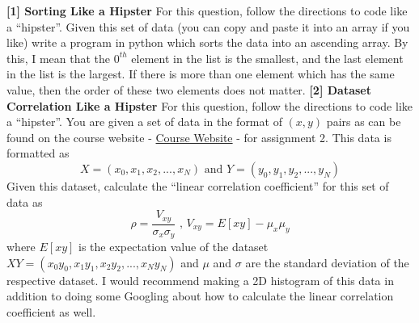 \documentclass[12pt]{article}
\begin{document}
\newline
\newline
\textbf{[1] Sorting Like a Hipster}
\newline
For this question, follow the directions to code like a ``hipster''.  
\newline
\newline
Given this set of data (you can copy and paste it into an array if you like)
\newline
\newline
[71, 51, 32, 62, 84, 109, 43, 92, 72, 41, 102, 80, 72, 69, 46, 94, 52, 95, 90, 72, 63, 70, 34, 80, 78, 34, 31, 37, 26, 41, 42, 107, 33, 108, 108, 75, 66, 23, 90, 53, 24, 70, 26, 41, 93, 24, 71, 39, 48, 66, 97, 107, 77, 71, 67, 39, 38, 107, 96, 92, 84, 46, 60, 95, 87, 90, 92, 63, 78, 78, 84, 107, 70, 108, 32, 36, 93, 108, 49, 72, 56, 43, 30, 56, 51, 97, 45, 92, 40, 43, 49, 83, 98, 28, 99, 97, 102, 89, 58, 87]
\newline
\newline
write a program in python which sorts the data into an ascending array.  By this, I mean that the $0^{th}$ element in the list is the smallest, and the last element in the list is the largest.  If there is more than one element which has the same value, then the order of these two elements does not matter.  
\newline
\newline
\textbf{[2] Dataset Correlation Like a Hipster}
\newline
For this question, follow the directions to code like a ``hipster''.  
\newline
\newline
You are given a set of data in the format of $(x,y)$ pairs as can be found on the course website - \href{https://sites.google.com/a/aims.edu.gh/the-life-of-a-particle}{Course Website} - for assignment 2.  This data is formatted as
\begin{displaymath}
X=(x_0, x_1, x_2, ..., x_N) \textrm{  and  } Y=(y_0, y_1, y_2, ..., y_N)
\end{displaymath}
Given this dataset, calculate the ``linear correlation coefficient'' for this set of data as
\begin{displaymath}
\rho=\frac{V_{xy}}{\sigma_{x}\sigma_{y}} \textrm{  ,  } V_{xy}=E[xy]-\mu_{x}\mu_{y}
\end{displaymath}
where $E[xy]$ is the expectation value of the dataset $XY=(x_{0}y_{0}, x_{1}y_{1}, x_{2}y_{2}, ..., x_{N}y_{N})$ and $\mu$ and $\sigma$ are the standard deviation of the respective dataset.  I would recommend making a 2D histogram of this data in addition to doing some Googling about how to calculate the linear correlation coefficient as well.
\end{document}

